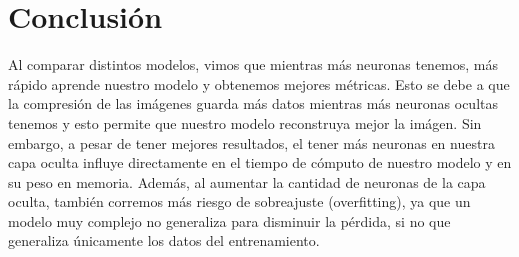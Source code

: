 \documentclass [a4paper,12pt,oneside,final]{article}
\begin{document}
\section{Conclusión}

Al comparar distintos modelos, vimos que mientras más neuronas tenemos, más rápido aprende nuestro modelo y obtenemos mejores métricas. Esto se debe a que la compresión de las imágenes guarda más datos mientras más neuronas ocultas tenemos y esto permite que nuestro modelo reconstruya mejor la imágen. Sin embargo, a pesar de tener mejores resultados, el tener más neuronas en nuestra capa oculta influye directamente en el tiempo de cómputo de nuestro modelo y en su peso en memoria. Además, al aumentar la cantidad de neuronas de la capa oculta, también corremos más riesgo de sobreajuste (overfitting), ya que un modelo muy complejo no generaliza para disminuir la pérdida, si no que generaliza únicamente los datos del entrenamiento.
\end{document}
